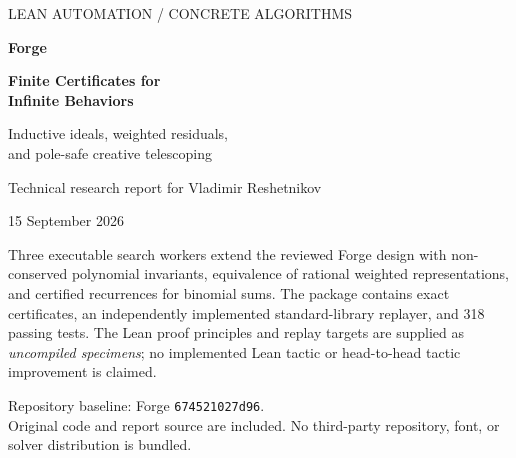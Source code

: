 \documentclass[11pt,letterpaper]{article}
\newcommand{\grind}{\texttt{grind}}
\theoremstyle{definition}\newtheorem{definition}[theorem]{Definition}
\theoremstyle{remark}\newtheorem{remark}[theorem]{Remark}
\begin{document}
\begin{titlepage}
\vspace*{0.7in}
{\large\color{muted}LEAN AUTOMATION / CONCRETE ALGORITHMS}\par
\vspace{0.35in}
{\Huge\bfseries\color{ink}Forge}\par
\vspace{0.15in}
{\huge\bfseries Finite Certificates for\\[5pt]Infinite Behaviors}\par
\vspace{0.3in}
{\Large Inductive ideals, weighted residuals,\\[4pt]and pole-safe creative telescoping}\par
\vspace{0.45in}
{\large Technical research report for Vladimir Reshetnikov}\par
{\large 15 September 2026}\par
\vspace{0.5in}
\begin{finding}
Three executable search workers extend the reviewed Forge design with
non-conserved polynomial invariants, equivalence of rational weighted
representations, and certified recurrences for binomial sums. The package
contains exact certificates, an independently implemented standard-library
replayer, and 318 passing tests. The Lean proof principles and replay targets
are supplied as \emph{uncompiled specimens}; no implemented Lean tactic or
head-to-head tactic improvement is claimed.
\end{finding}
\vfill
{\small\color{muted}Repository baseline: Forge \texttt{674521027d96}.\\
Original code and report source are included. No third-party repository, font,
or solver distribution is bundled.}
\end{titlepage}
\begin{abstract}
Forge already proposes a proof-planning layer above Lean's \grind{}, including
induction generalization, arithmetic witnesses, nonlinear certificates, and
careful evidence management. This report develops three additional algorithmic
capabilities rather than restating that architecture. First, a descending
sequence of finite-dimensional polynomial spaces discovers jointly inductive
ideals with polynomial transition multipliers. Second, reachable-space closure
proves equivalence of rational weighted representations, or returns a concrete
distinguishing word. Third, a bounded creative-telescoping search synthesizes
recurrences together with regularized, pole-safe summation certificates.
Each worker has an explicit source fragment, a finite acceptance language, a
soundness argument, a sharply delimited completeness statement, and an
implementation path into Lean. The executed corpus contains 27 invariant
certificates, 23 weighted closure certificates, 25 distinguishing words, and
three telescopers; four bounded searches return unknown. Independent replay
works with Python's site packages disabled. The report separates these results
from the still-unimplemented Lean front ends, formalized checker theorems, and
end-to-end tactic benchmarks.
\end{abstract}
\end{document}
